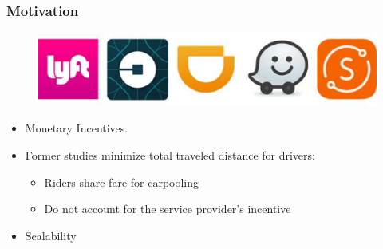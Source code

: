 \documentclass[t]{beamer}
\begin{document}
\begin{frame}\frametitle{Motivation}
\vspace{-0.28in}
\begin{figure}
	\centering
    \includegraphics[width = 0.55\columnwidth]{ride-sharings}
\end{figure}
\vspace{-0.23in}
\begin{itemize}
\item Monetary Incentives.
\item Former studies minimize total traveled distance for drivers:
\begin{itemize}
\item Riders share fare for carpooling
\item Do not account for the service provider's incentive
\end{itemize}
\item Scalability
\end{itemize}
\end{frame}
\end{document}
